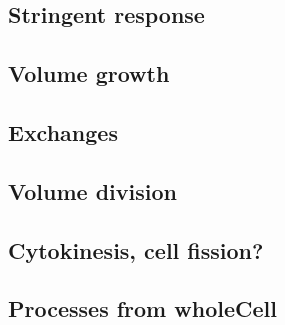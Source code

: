 \subsection{Stringent response} \label{sec:stringentResponse}


\subsection{Volume growth}


\subsection{Exchanges}


\subsection{Volume division}


\subsection{Cytokinesis, cell fission?}


\subsection{Processes from wholeCell}

